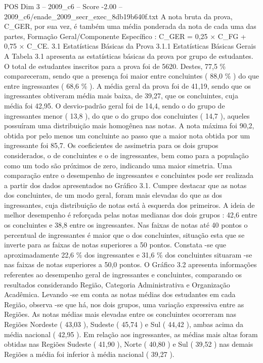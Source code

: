 \begin{textsample}{POS Dim 3 – 2009\_c6 – Score -2.00 – 2009\_c6/enade\_2009\_secr\_exec\_8db19b640f.txt}
A nota bruta da prova, C\_GER, por sua vez, é também uma média ponderada da nota de cada uma das partes, Formação Geral/Componente Específico : C\_GER = 0,25 × C\_FG + 0,75 × C\_CE. 3.1 Estatísticas Básicas da Prova 3.1.1 Estatísticas Básicas Gerais A Tabela 3.1 apresenta as estatísticas básicas da prova por grupo de estudantes.
O total de estudantes inscritos para a prova foi de 5620.
Destes, 77,5 \% compareceram, sendo que a presença foi maior entre concluintes ( 88,0 \% ) do que entre ingressantes ( 68,6 \% ).
A média geral da prova foi de 41,19, sendo que os ingressantes obtiveram média mais baixa, de 39,27, que os concluintes, cuja média foi 42,95.
O desvio-padrão geral foi de 14,4, sendo o do grupo de ingressantes menor ( 13,8 ), do que o do grupo dos concluintes ( 14,7 ), aqueles possuíram uma distribuição mais homogênea nas notas.
A nota máxima foi 90,2, obtida por pelo menos um concluinte ao passo que a maior nota obtida por um ingressante foi 85,7.
Os coeficientes de assimetria para os dois grupos considerados, o de concluintes e o de ingressantes, bem como para a população como um todo são próximos de zero, indicando uma maior simetria.
Uma comparação entre o desempenho de ingressantes e concluintes pode ser realizada a partir dos dados apresentados no Gráfico 3.1.
Cumpre destacar que as notas dos concluintes, de um modo geral, foram mais elevadas do que as dos ingressantes, cuja distribuição de notas está à esquerda dos primeiros.
A ideia de melhor desempenho é reforçada pelas notas medianas dos dois grupos : 42,6 entre os concluintes e 38,8 entre os ingressantes.
Nas faixas de notas até 40 pontos o percentual de ingressantes é maior que o dos concluintes, situação esta que se inverte para as faixas de notas superiores a 50 pontos.
Constata -se que aproximadamente 22,6 \% dos ingressantes e 31,6 \% dos concluintes situaram -se nas faixas de notas superiores a 50,0 pontos.
O Gráfico 3.2 apresenta informações referentes ao desempenho geral de ingressantes e concluintes, comparando os resultados considerando Região, Categoria Administrativa e Organização Acadêmica.
Levando -se em conta as notas médias dos estudantes em cada Região, observa -se que há, nos dois grupos, uma variação expressiva entre as Regiões.
As notas médias mais elevadas entre os concluintes ocorreram nas Regiões Nordeste ( 43,03 ), Sudeste ( 45,74 ) e Sul ( 44,42 ), ambas acima da média nacional ( 42,95 ).
Em relação aos ingressantes, as médias mais altas foram obtidas nas Regiões Sudeste ( 41,90 ), Norte ( 40,80 ) e Sul ( 39,52 ) nas demais Regiões a média foi inferior à média nacional ( 39,27 ).

\end{textsample}
